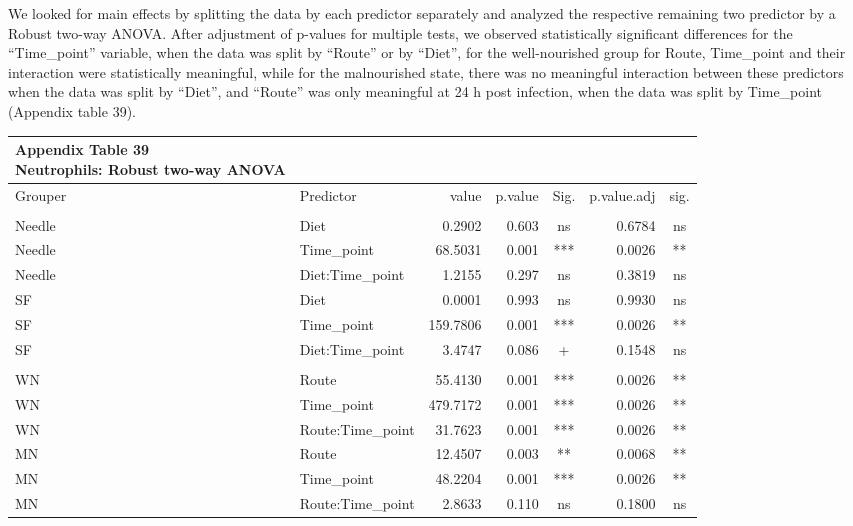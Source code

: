 \documentclass[
  12pt,
  letterpaper,
]{article}
\begin{document}
We looked for main effects by splitting the data by each predictor separately and analyzed the respective remaining two predictor by a Robust two-way ANOVA. After adjustment of p-values for multiple tests, we observed statistically significant differences for the ``Time\_point'' variable, when the data was split by ``Route'' or by ``Diet'', for the well-nourished group for Route, Time\_point and their interaction were statistically meaningful, while for the malnourished state, there was no meaningful interaction between these predictors when the data was split by ``Diet'', and ``Route'' was only meaningful at 24 h post infection, when the data was split by Time\_point (Appendix table 39).

\begingroup
\fontsize{12.0pt}{14.4pt}\selectfont
\begin{longtable}{l|lrrcrc}
\caption*{
{\large \textbf{Appendix Table 39}} \\ 
{\small \textbf{Neutrophils: Robust two-way ANOVA}}
} \\ 
\toprule
Grouper & {Predictor} & {value} & {p.value} & {Sig.} & {p.value.adj} & {sig.} \\ 
\midrule\addlinespace[2.5pt]
\multicolumn{7}{l}{Grouped by Route} \\[2.5pt] 
\midrule\addlinespace[2.5pt]
Needle & Diet &   0.2902 & 0.603 & ns & 0.6784 & ns \\ 
Needle & Time\_point &  68.5031 & 0.001 & *** & 0.0026 & ** \\ 
Needle & Diet:Time\_point &   1.2155 & 0.297 & ns & 0.3819 & ns \\ 
SF & Diet &   0.0001 & 0.993 & ns & 0.9930 & ns \\ 
SF & Time\_point & 159.7806 & 0.001 & *** & 0.0026 & ** \\ 
SF & Diet:Time\_point &   3.4747 & 0.086 & + & 0.1548 & ns \\ 
\midrule\addlinespace[2.5pt]
\multicolumn{7}{l}{Grouped by Diet} \\[2.5pt] 
\midrule\addlinespace[2.5pt]
WN & Route &  55.4130 & 0.001 & *** & 0.0026 & ** \\ 
WN & Time\_point & 479.7172 & 0.001 & *** & 0.0026 & ** \\ 
WN & Route:Time\_point &  31.7623 & 0.001 & *** & 0.0026 & ** \\ 
MN & Route &  12.4507 & 0.003 & ** & 0.0068 & ** \\ 
MN & Time\_point &  48.2204 & 0.001 & *** & 0.0026 & ** \\ 
MN & Route:Time\_point &   2.8633 & 0.110 & ns & 0.1800 & ns \\ 

\end{longtable}
\end{document}
